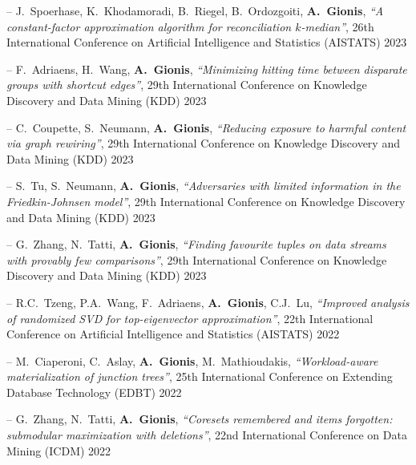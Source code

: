 \documentclass[a4paper,11pt]{article}
\begin{document}
\item[--] 
{J.\ Spoerhase, K.\ Khodamoradi, B.\ Riegel, B.\ Ordozgoiti, \textbf{A.\ Gionis}},
{\em ``A constant-factor approximation algorithm for reconciliation $k$-median''}, 
26th International Conference on Artificial Intelligence and Statistics (AISTATS) 2023

\item[--] 
{F.\ Adriaens, H.\ Wang, \textbf{A.\ Gionis}},
{\em ``Minimizing hitting time between disparate groups with shortcut edges''},
29th International Conference on Knowledge Discovery and Data Mining (KDD) 2023

\item[--] 
{C.\ Coupette, S.\ Neumann, \textbf{A.\ Gionis}},
{\em ``Reducing exposure to harmful content via graph rewiring''},
29th International Conference on Knowledge Discovery and Data Mining (KDD) 2023

\item[--] 
{S.\ Tu, S.\ Neumann, \textbf{A.\ Gionis}},
{\em ``Adversaries with limited information in the Friedkin-Johnsen model''},
29th International Conference on Knowledge Discovery and Data Mining (KDD) 2023

\item[--] 
{G.\ Zhang, N.\ Tatti, \textbf{A.\ Gionis}},
{\em ``Finding favourite tuples on data streams with provably few comparisons''},
29th International Conference on Knowledge Discovery and Data Mining (KDD) 2023

\item[--] 
{R.C.\ Tzeng, P.A.\ Wang, F.\ Adriaens, \textbf{A.\ Gionis}, C.J.\ Lu},
{\em ``Improved analysis of randomized SVD for top-eigenvector approximation''},
22th International Conference on Artificial Intelligence and Statistics (AISTATS) 2022

\item[--] 
{M.\ Ciaperoni, C.\ Aslay, \textbf{A.\ Gionis}, M.\ Mathioudakis},
{\em ``Workload-aware materialization of junction trees''},
25th International Conference on Extending Database Technology (EDBT) 2022


\item[--] 
{G.\ Zhang, N.\ Tatti, \textbf{A.\ Gionis}},
{\em ``Coresets remembered and items forgotten: submodular maximization with deletions''},
22nd International Conference on Data Mining (ICDM) 2022
\end{document}
